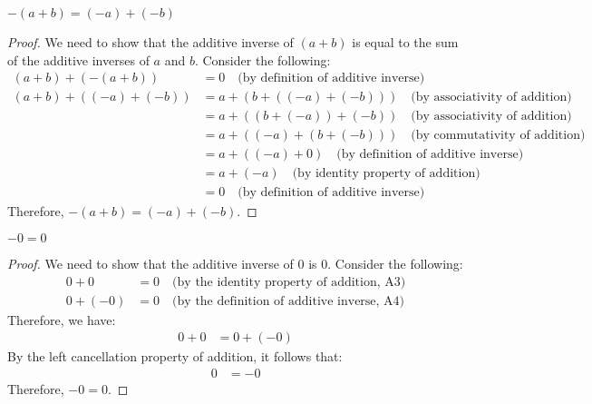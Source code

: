 \documentclass[11pt]{article}
\begin{document}
\begin{proposition}
    $-(a + b) = (-a) + (-b)$
\end{proposition}

\begin{proof}
    We need to show that the additive inverse of $(a + b)$ is equal to the sum of the additive inverses of $a$ and $b$. Consider the following:
    \begin{align*}
        (a + b) + (-(a + b))    & = 0 \quad \text{(by definition of additive inverse)}                  \\
        (a + b) + ((-a) + (-b)) & = a + (b + ((-a) + (-b))) \quad \text{(by associativity of addition)} \\
                                & = a + ((b + (-a)) + (-b)) \quad \text{(by associativity of addition)} \\
                                & = a + ((-a) + (b + (-b))) \quad \text{(by commutativity of addition)} \\
                                & = a + ((-a) + 0) \quad \text{(by definition of additive inverse)}     \\
                                & = a + (-a) \quad \text{(by identity property of addition)}            \\
                                & = 0 \quad \text{(by definition of additive inverse)}
    \end{align*}
    Therefore, $-(a + b) = (-a) + (-b)$.
\end{proof}

\begin{proposition}
    $-0 = 0$
\end{proposition}

\begin{proof}
    We need to show that the additive inverse of $0$ is $0$. Consider the following:
    \begin{align*}
        0 + 0    & = 0 \quad \text{(by the identity property of addition, A3)}  \\
        0 + (-0) & = 0 \quad \text{(by the definition of additive inverse, A4)}
    \end{align*}
    Therefore, we have:
    \begin{align*}
        0 + 0 & = 0 + (-0)
    \end{align*}
    By the left cancellation property of addition, it follows that:
    \begin{align*}
        0 & = -0
    \end{align*}
    Therefore, $-0 = 0$.
\end{proof}
\end{document}
